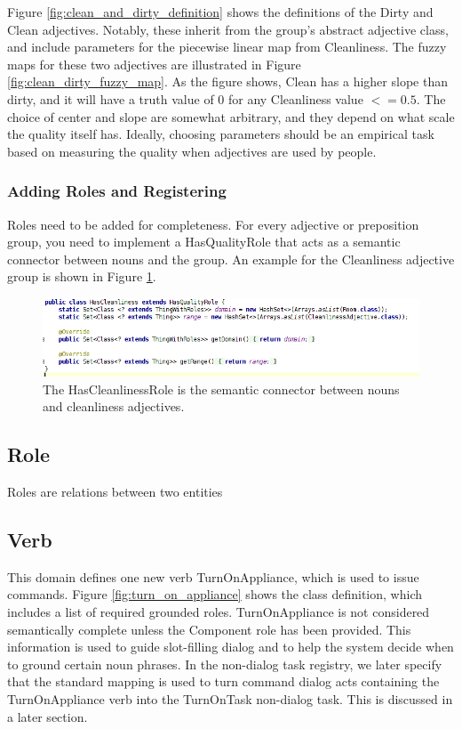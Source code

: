 \documentclass[titlepage]{article}
\begin{document}
Figure \ref{fig:clean_and_dirty_definition} shows the definitions of the Dirty and Clean adjectives.
Notably, these inherit from the group's abstract adjective class, and include parameters for the piecewise linear map from Cleanliness.
The fuzzy maps for these two adjectives are illustrated in Figure \ref{fig:clean_dirty_fuzzy_map}.
As the figure shows, Clean has a higher slope than dirty, and it will have a truth value of $0$ for any Cleanliness value $<= 0.5$.
The choice of center and slope are somewhat arbitrary, and they depend on what scale the quality itself has.
Ideally, choosing parameters should be an empirical task based on measuring the quality when adjectives are used by people.


\subsubsection{Adding Roles and Registering}

Roles need to be added for completeness.
For every adjective or preposition group, you need to implement a HasQualityRole that acts as a semantic connector between nouns and the group.
An example for the Cleanliness adjective group is shown in Figure \ref{fig:has_cleanliness_role}.

\begin{figure}[h!]
\centering
\includegraphics[width=\textwidth]{HasCleanlinessRole}
\caption{The HasCleanlinessRole is the semantic connector between nouns and cleanliness adjectives.}
\label{fig:has_cleanliness_role}
\end{figure}



\subsection{Role}
Roles are relations between two entities

\subsection{Verb}
This domain defines one new verb TurnOnAppliance, which is used to issue commands.
Figure \ref{fig:turn_on_appliance} shows the class definition, which includes a list of required grounded roles.
TurnOnAppliance is not considered semantically complete unless the Component role has been provided.
This information is used to guide slot-filling dialog and to help the system decide when to ground certain noun phrases.
In the non-dialog task registry, we later specify that the standard mapping is used to turn command dialog acts containing the TurnOnAppliance verb into the TurnOnTask non-dialog task.
This is discussed in a later section.
\end{document}
